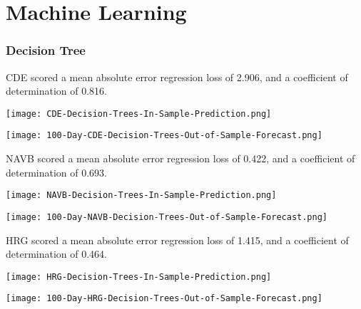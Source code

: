 \section{Machine Learning}

\subsubsection{Decision Tree}

CDE scored a mean absolute error regression loss of 2.906, and a coefficient of determination of 0.816.

\begin{center}
    \texttt{[image: CDE-Decision-Trees-In-Sample-Prediction.png]}
    \label{fig:nonfloat}
\end{center}

\begin{center}  
    \texttt{[image: 100-Day-CDE-Decision-Trees-Out-of-Sample-Forecast.png]}
    \label{fig:nonfloat}
\end{center}

NAVB scored a mean absolute error regression loss of 0.422, and a coefficient of determination of 0.693.

\begin{center}
    \texttt{[image: NAVB-Decision-Trees-In-Sample-Prediction.png]}
    \label{fig:nonfloat}
\end{center}

\begin{center}  
    \texttt{[image: 100-Day-NAVB-Decision-Trees-Out-of-Sample-Forecast.png]}
    \label{fig:nonfloat}
\end{center}

HRG scored a mean absolute error regression loss of 1.415, and a coefficient of determination of 0.464.

\begin{center}
    \texttt{[image: HRG-Decision-Trees-In-Sample-Prediction.png]}
    \label{fig:nonfloat}
\end{center}

\begin{center}  
    \texttt{[image: 100-Day-HRG-Decision-Trees-Out-of-Sample-Forecast.png]}
    \label{fig:nonfloat}
\end{center}

